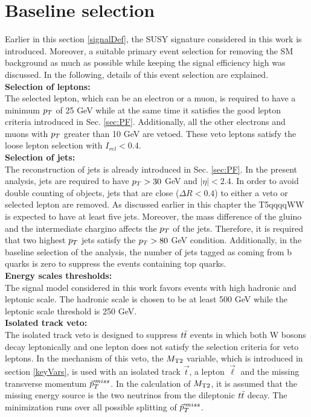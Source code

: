 \section{Baseline selection}
\label{sec:BL}
Earlier in this section \ref{signalDef}, the SUSY signature considered in this work is introduced. Moreover, a suitable primary event selection for removing the SM background as much as possible while keeping the signal efficiency high was discussed. In the following, details of this event selection are explained.\\
\textbf{Selection of leptons:}\\
The selected lepton, which can be an electron or a muon, is required to have a minimum $p_T$ of 25 GeV while at the same time it satisfies the good lepton criteria introduced in Sec. \ref{sec:PF}. Additionally, all the other electrons and muons with $p_T$ greater than 10 GeV are vetoed. These veto leptons satisfy the loose lepton selection with $I_{rel}<0.4$.
\\
\textbf{Selection of jets:}\\
The reconstruction of jets is already introduced in Sec. \ref{sec:PF}. In the present analysis, jets are required to have $p_T > 30$ GeV and $| \eta | < 2.4 $. In order to avoid double counting of objects, jets that are close ($\Delta R <0.4$) to either a veto or selected lepton are removed.
As discussed earlier in this chapter the T5qqqqWW is expected to have at least five jets. Moreover, the mass difference of the gluino and the intermediate chargino affects the $p_T$ of the jets. Therefore, it is required that two highest $p_T$ jets satisfy the $p_T >80$ GeV condition. Additionally, in the baseline selection of the analysis, the number of jets tagged as coming from b quarks is zero to suppress the events containing top quarks.
\\
\textbf{Energy scales thresholds:}\\
The signal model considered in this work favors events with high hadronic and leptonic scale. The hadronic scale is chosen to be at least 500 GeV while the leptonic scale threshold is 250 GeV.
\\
\textbf{Isolated track veto:}\\
The isolated track veto is designed to suppress $t\bar{t}$ events in which both W bosons decay leptonically and one lepton does not satisfy the selection criteria for veto leptons. In the mechanism of this veto, the $M_\mathrm{T2}$ variable, which is introduced in section \ref{keyVars}, is used with an isolated track $\vec{t}$, a lepton $\vec{\ell}$ and the missing transverse momentum $\vec{p}_T^{\,miss}$. In the calculation of $M_\mathrm{T2}$, it is assumed that the missing energy source is the two neutrinos from the dileptonic $t\bar{t}$ decay. The minimization runs over all possible splitting of $\vec{p}_T^{\,miss}$.
